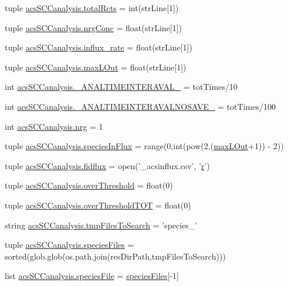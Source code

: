 \begin{DoxyCompactItemize}
\item 
tuple \hyperlink{a00102_a9f0e87ff21f3597668f5ad076224da87}{acs\-S\-C\-Canalysis.\-total\-Rcts} = int(str\-Line\mbox{[}1\mbox{]})
\item 
tuple \hyperlink{a00102_a24d5f5a61d56c596017396ad272ef4a4}{acs\-S\-C\-Canalysis.\-nrg\-Conc} = float(str\-Line\mbox{[}1\mbox{]})
\item 
tuple \hyperlink{a00102_a3a8adee26325d72aca909e91b0fd3ea5}{acs\-S\-C\-Canalysis.\-influx\-\_\-rate} = float(str\-Line\mbox{[}1\mbox{]})
\item 
tuple \hyperlink{a00102_a47da7b9153a0e4a33512f6d2675b8c1a}{acs\-S\-C\-Canalysis.\-max\-L\-Out} = float(str\-Line\mbox{[}1\mbox{]})
\item 
int \hyperlink{a00102_a46f1fb71bdcdb1c8679ae847d0d4b63f}{acs\-S\-C\-Canalysis.\-\_\-\-A\-N\-A\-L\-T\-I\-M\-E\-I\-N\-T\-E\-R\-A\-V\-A\-L\-\_\-} = tot\-Times/10
\item 
int \hyperlink{a00102_a7665e828ed7f27f4ba353e9645ad716d}{acs\-S\-C\-Canalysis.\-\_\-\-A\-N\-A\-L\-T\-I\-M\-E\-I\-N\-T\-E\-R\-A\-V\-A\-L\-N\-O\-S\-A\-V\-E\-\_\-} = tot\-Times/100
\item 
int \hyperlink{a00102_a948683f966c62ac856582281c3cda1f4}{acs\-S\-C\-Canalysis.\-nrg} = 1
\item 
tuple \hyperlink{a00102_a36f6b63269e716f42cd38a36a781a4cf}{acs\-S\-C\-Canalysis.\-species\-In\-Flux} = range(0,int(pow(2,(\hyperlink{a00071_abb126c97fed10420e64f85923bf5e04b}{max\-L\-Out}+1)) -\/ 2))
\item 
tuple \hyperlink{a00102_a0c40e4d9928e8df792b31c7a431d3fba}{acs\-S\-C\-Canalysis.\-fidflux} = open('\-\_\-acsinflux.\-csv', '\hyperlink{a00031_ac862e7284527eb913b1351c8bfb8e079}{r}')
\item 
tuple \hyperlink{a00102_a12e61f8d7aadb52256a7728af342bae3}{acs\-S\-C\-Canalysis.\-over\-Threshold} = float(0)
\item 
tuple \hyperlink{a00102_a93de20dd9ebf791127ac5aefc0a2df8d}{acs\-S\-C\-Canalysis.\-over\-Threshold\-T\-O\-T} = float(0)
\item 
string \hyperlink{a00102_a141356fc914110fdf3ec4f0fc3beaab5}{acs\-S\-C\-Canalysis.\-tmp\-Files\-To\-Search} = 'species\-\_\-'
\item 
tuple \hyperlink{a00102_a4f47408478e9a0590d016df50cf42141}{acs\-S\-C\-Canalysis.\-species\-Files} = sorted(glob.\-glob(os.\-path.\-join(res\-Dir\-Path,tmp\-Files\-To\-Search)))
\item 
list \hyperlink{a00102_a1d066fa24dced2da12ffd9a8514a17ba}{acs\-S\-C\-Canalysis.\-species\-File} = \hyperlink{a00028_af5703745c2c2a6af7f62da460994d9c2}{species\-Files}\mbox{[}-\/1\mbox{]}

\end{DoxyCompactItemize}
